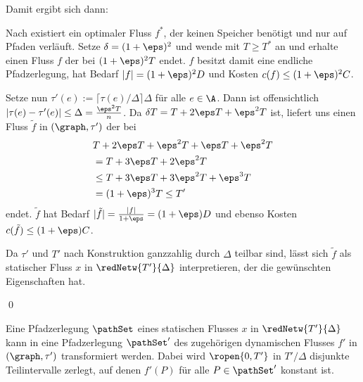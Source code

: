 Damit ergibt sich dann:
\begin{standaloneProof}
    Nach  existiert ein optimaler Fluss $f^*$, der
    keinen Speicher benötigt und nur auf Pfaden verläuft.
    Setze $\delta = (1 + \eps)^2$ und wende  mit
    $T \geq T^*$ an und erhalte einen Fluss $f$ der bei $(1 + \eps)^2 T$ endet.
    $f$ besitzt damit eine endliche Pfadzerlegung, hat Bedarf
    $|f| = (1 + \eps)^2 D$ und Kosten $c(f) \leq (1 + \eps)^2 C$.
    
    Setze nun $\tau'(e) := \lceil \tau(e) / \Delta \rceil \Delta$ für
    alle $e \in \A$. Dann ist offensichtlich
    $|\tau(e) - \tau'(e)| \leq \Delta = \frac{\eps^2 T}{n}$.
    Da $\delta T = T + 2 \eps T + \eps^2 T$ ist, liefert
     uns einen Fluss $\tilde{f}$ in $(\graph, \tau')$
    der bei
    \begin{align*}
        & T + 2 \eps T + \eps^2 T + \eps T + \eps^2 T \\
        & = T + 3 \eps T + 2 \eps^2 T \\
        & \leq T + 3 \eps T + 3 \eps^2 T + \eps^3 T \\
        & = (1 + \eps)^3 T \leq T'
    \end{align*}
    endet. $\tilde{f}$ hat Bedarf
    $|\tilde{f}| = \frac{|f|}{1+\eps} = (1 + \eps) D$ und ebenso
    Kosten $c(\tilde{f}) \leq (1 + \eps) C$.
    
    Da $\tau'$ und $T'$ nach Konstruktion ganzzahlig durch
    $\Delta$ teilbar sind, lässt sich $\tilde{f}$ als statischer Fluss $x$ in
    $\redNetw{T'}{\Delta}$ interpretieren, der die gewünschten
    Eigenschaften hat.
    
    \begin{flushright}\qed \end{flushright}
\end{standaloneProof}

\begin{lemma}\label{lem:path_decomp}
    Eine Pfadzerlegung $\pathSet$ eines statischen Flusses $x$ in
    $\redNetw{T'}{\Delta}$ kann in eine Pfadzerlegung $\pathSet'$ des
    zugehörigen dynamischen Flusses $f'$ in $(\graph, \tau')$ 
    transformiert werden. Dabei wird $\ropen{0, T'}$ in $T'/\Delta$
    disjunkte Teilintervalle zerlegt, auf denen $f'(P)$ für alle $P \in \pathSet'$
    konstant ist.
\end{lemma}

